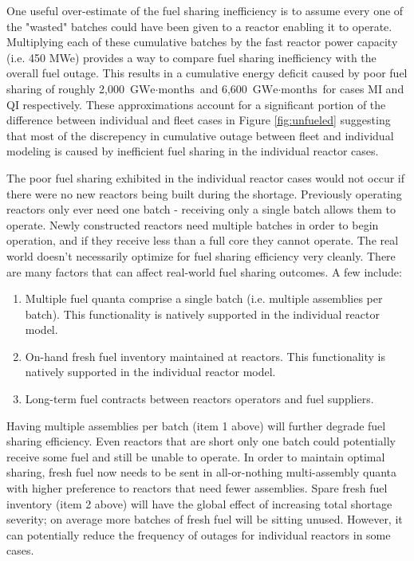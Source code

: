 \documentclass{style}
\begin{document}
One useful over-estimate of the fuel sharing inefficiency is to assume every
one of the "wasted" batches could have been given to a reactor enabling it to
operate.  Multiplying each of these cumulative batches by the fast reactor power capacity
(i.e. 450 MWe) provides a way to compare fuel sharing inefficiency with the
overall fuel outage.  This results in a cumulative energy deficit caused by
poor fuel sharing of roughly 2,000 $\text{GWe} \cdot \text{months}$ and 6,600
$\text{GWe} \cdot \text{months}$ for cases MI and QI respectively.  These
approximations account for a significant portion of the difference between individual
and fleet cases in Figure \ref{fig:unfueled} suggesting that most of the
discrepency in cumulative outage between fleet and individual modeling is
caused by inefficient fuel sharing in the individual reactor cases.

The poor fuel sharing exhibited in the individual reactor cases would not
occur if there were no new reactors being built during the shortage.
Previously operating reactors only ever need one batch - receiving only a
single batch allows them to operate.  Newly constructed reactors need multiple
batches in order to begin operation, and if they receive less than a full core
they cannot operate.  The real world doesn't necessarily optimize for fuel
sharing efficiency very cleanly. There are many factors that can affect
real-world fuel sharing outcomes.  A few include:

\begin{enumerate}

    \item Multiple fuel quanta comprise a single batch (i.e. multiple
        assemblies per batch). This functionality is natively supported in the
        individual reactor model.

    \item On-hand fresh fuel inventory maintained at reactors. This
        functionality is natively supported in the individual reactor model.

    \item Long-term fuel contracts between reactors operators and fuel
        suppliers.

\end{enumerate}

Having multiple assemblies per batch (item 1 above) will further degrade fuel
sharing efficiency.  Even reactors that are short only one batch could
potentially receive some fuel and still be unable to operate.  In order to
maintain optimal sharing, fresh fuel now needs to be sent in all-or-nothing
multi-assembly quanta with higher preference to reactors that need fewer
assemblies.  Spare fresh fuel inventory (item 2 above) will have the global
effect of increasing total shortage severity; on average more batches of fresh
fuel will be sitting unused.  However, it can potentially reduce the frequency
of outages for individual reactors in some cases.
\end{document}
